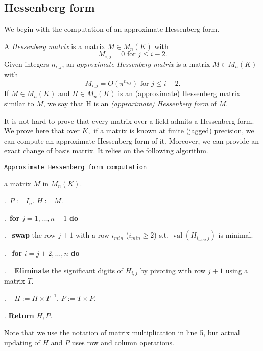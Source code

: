 \documentclass{sig-alternate-05-2015}
\DeclareMathOperator{\val}{val}
\begin{document}
\subsection{Hessenberg form}

We begin with the computation of
an approximate Hessenberg form.

\begin{deftn}
A \emph{Hessenberg matrix} is a matrix $M \in M_n(K)$ with
\[
M_{i,j}=0 \mbox{ for $j \le i-2$.}
\]
Given integers $n_{i,j}$, an \emph{approximate Hessenberg matrix}
is a matrix $M \in M_n(K)$ with
\[
M_{i,j} = O(\pi^{n_{i,j}}) \mbox{ for $j \le i-2$.}
\]
If $M \in M_n (K)$ and $H \in M_n (K)$ is an (approximate) Hessenberg matrix
similar to $M$, we say that H is an \emph{(approximate) Hessenberg form} of $M.$
\end{deftn}

It is not hard to prove that every matrix over a field admits
a Hessenberg form.
We prove here that over $K,$ if a matrix is 
known at finite (jagged) precision,
we can compute an approximate Hessenberg form of it.
Moreover, we can provide an exact change of basis matrix.
It relies on the following algorithm.


\noindent\hrulefill

 {\tt Approximate Hessenberg form computation}

 a matrix $M$ in $M_n(K).$

\smallskip

.\ $P:=I_n.$ \: $H:=M.$


.\ {\bf for} $j=1,\dots,n-1$ {\bf do} 

.\  \:  {\bf swap} the row $j+1$ with a row $i_{min}$ ($i_{min} \geq 2$) s.t. $\val(H_{i_{min},j})$ is minimal. 

.\  \:  {\bf for} $i=j+2,\dots,n$ {\bf do} 

. \ \: \:  \textbf{Eliminate} the significant digits of $H_{i,j}$ by pivoting with row $j+1$ 
using a matrix $T.$

. \ \: \:  $H:=H \times T^{-1}.$ \: $P:=T \times P.$

. \textbf{Return} $H,P.$

\vspace{-1ex}\noindent\hrulefill

\medskip

Note that we use the notation of matrix multiplication in line 5, but actual updating of
$H$ and $P$ uses row and column operations.
\end{document}
